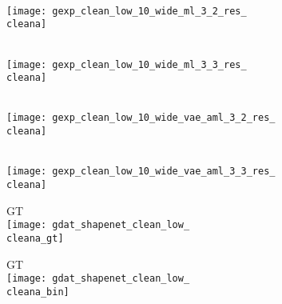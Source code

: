 \begin{figure*}[t]
{\begin{subfigure}[t]{1\textwidth}
\begin{subfigure}[t]{0.095\textwidth}
            \vspace{0px}\centering
            \ML\\
            \texttt{[image: gexp\_clean\_low\_10\_wide\_ml\_3\_2\_res\_\\cleana]}
        \end{subfigure}
        \begin{subfigure}[t]{0.095\textwidth}
            \vspace{0px}\centering
            \ML\\
            \texttt{[image: gexp\_clean\_low\_10\_wide\_ml\_3\_3\_res\_\\cleana]}
        \end{subfigure}
        \begin{subfigure}[t]{0.095\textwidth}
        	\vspace{0px}\centering
        	\AML\\
        	\texttt{[image: gexp\_clean\_low\_10\_wide\_vae\_aml\_3\_2\_res\_\\cleana]}
        \end{subfigure}
        \begin{subfigure}[t]{0.095\textwidth}
            \vspace{0px}\centering
            \AML\\
            \texttt{[image: gexp\_clean\_low\_10\_wide\_vae\_aml\_3\_3\_res\_\\cleana]}
        \end{subfigure}
        \begin{subfigure}[t]{0.095\textwidth}
        	\vspace{0px}\centering
        	GT\\
        	\texttt{[image: gdat\_shapenet\_clean\_low\_\\cleana\_gt]}
        \end{subfigure}
        \begin{subfigure}[t]{0.095\textwidth}
            \vspace{0px}\centering
            GT\\
            \texttt{[image: gdat\_shapenet\_clean\_low\_\\cleana\_bin]}
        \end{subfigure}
        \\[-2px]
        \begin{subfigure}[t]{0.095\textwidth}

\end{subfigure}
\end{subfigure}}
\end{figure*}
